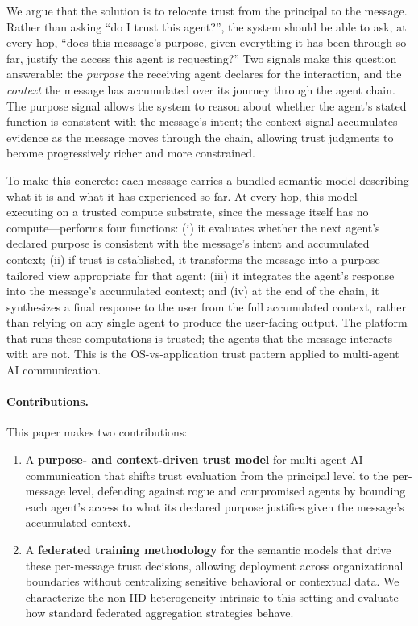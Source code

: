 \documentclass[sigconf,nonacm]{acmart}
\begin{document}
We argue that the solution is to relocate trust from the principal to the message. Rather than asking ``do I trust this agent?'', the system should be able to ask, at every hop, ``does this message's purpose, given everything it has been through so far, justify the access this agent is requesting?'' Two signals make this question answerable: the \emph{purpose} the receiving agent declares for the interaction, and the \emph{context} the message has accumulated over its journey through the agent chain. The purpose signal allows the system to reason about whether the agent's stated function is consistent with the message's intent; the context signal accumulates evidence as the message moves through the chain, allowing trust judgments to become progressively richer and more constrained.

To make this concrete: each message carries a bundled semantic model describing what it is and what it has experienced so far. At every hop, this model---executing on a trusted compute substrate, since the message itself has no compute---performs four functions: (i) it evaluates whether the next agent's declared purpose is consistent with the message's intent and accumulated context; (ii) if trust is established, it transforms the message into a purpose-tailored view appropriate for that agent; (iii) it integrates the agent's response into the message's accumulated context; and (iv) at the end of the chain, it synthesizes a final response to the user from the full accumulated context, rather than relying on any single agent to produce the user-facing output. The platform that runs these computations is trusted; the agents that the message interacts with are not. This is the OS-vs-application trust pattern applied to multi-agent AI communication.


\paragraph{Contributions.} This paper makes two contributions:
\begin{enumerate}
    \item A \textbf{purpose- and context-driven trust model} for multi-agent AI communication that shifts trust evaluation from the principal level to the per-message level, defending against rogue and compromised agents by bounding each agent's access to what its declared purpose justifies given the message's accumulated context.
    \item A \textbf{federated training methodology} for the semantic models that drive these per-message trust decisions, allowing deployment across organizational boundaries without centralizing sensitive behavioral or contextual data. We characterize the non-IID heterogeneity intrinsic to this setting and evaluate how standard federated aggregation strategies behave.
\end{enumerate}
\end{document}
